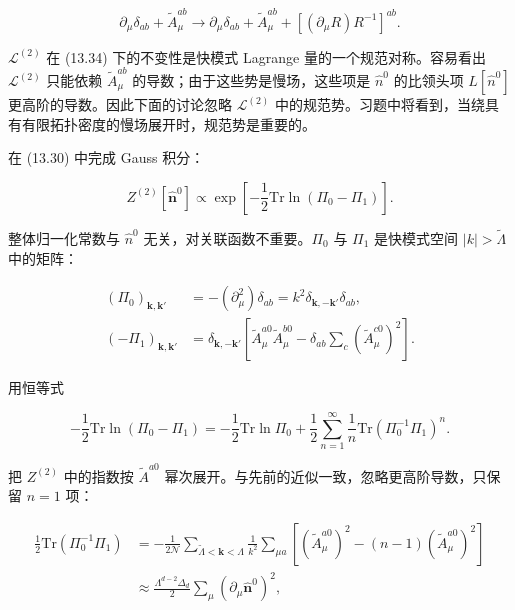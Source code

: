 \begin{equation*}
\partial_ {\mu} \delta_ {ab} + \tilde {A} _ {\mu} ^ {ab} \rightarrow \partial_ {\mu} \delta_ {ab} + \tilde {A} _ {\mu} ^ {ab} + \left[ ( \partial_ {\mu} R ) R ^ {- 1} \right] ^ {ab}.
\tag{13.34}
\end{equation*}

$\mathcal{L}^{(2)}$ 在 (13.34) 下的不变性是快模式 Lagrange 量的一个规范对称。容易看出 $\mathcal{L}^{(2)}$ 只能依赖 $\tilde{A}_{\mu}^{ab}$ 的导数；由于这些势是慢场，这些项是 $\hat{n}^{0}$ 的比领头项 $L[\hat{n}^{0}]$ 更高阶的导数。因此下面的讨论忽略 $\mathcal{L}^{(2)}$ 中的规范势。习题中将看到，当绕具有有限拓扑密度的慢场展开时，规范势是重要的。

在 (13.30) 中完成 Gauss 积分：

\begin{equation*}
Z ^ {(2)} [ \hat {\mathbf {n}} ^ {0} ] \propto \exp \left[ - \frac {1}{2} \mathrm{Tr} \ln \left( \Pi_ {0} - \Pi_ {1} \right) \right].
\tag{13.35}
\end{equation*}

整体归一化常数与 $\hat{n}^{0}$ 无关，对关联函数不重要。$\Pi_{0}$ 与 $\Pi_{1}$ 是快模式空间 $|k| > \tilde{\Lambda}$ 中的矩阵：

\begin{align*}
\left( \Pi_ {0} \right)_{\mathbf {k}, \mathbf {k} '} & = - \left( \partial_ {\mu} ^ {2} \right) \delta_ {ab} = k ^ {2} \delta_{\mathbf {k}, - \mathbf {k} '} \delta_ {ab} ,\\
\left( - \Pi_ {1} \right)_{\mathbf {k}, \mathbf {k} '} & = \delta_{\mathbf {k}, - \mathbf {k} '} \left[ \tilde {A} _ {\mu} ^ {a 0} \tilde {A} _ {\mu} ^ {b 0} - \delta_ {ab} \sum_ {c} \left( \tilde {A} _ {\mu} ^ {c 0} \right) ^ {2} \right] .
\tag{13.36}
\end{align*}

用恒等式

\begin{equation*}
- \frac {1}{2} \mathrm{Tr} \ln \left( \Pi_ {0} - \Pi_ {1} \right) = - \frac {1}{2} \mathrm{Tr} \ln \Pi_ {0} + \frac {1}{2} \sum_ {n = 1} ^ {\infty} \frac {1}{n} \mathrm{Tr} \left( \Pi_ {0} ^ {- 1} \Pi_ {1} \right) ^ {n}.
\tag{13.37}
\end{equation*}

把 $Z^{(2)}$ 中的指数按 $\tilde{A}^{a0}$ 幂次展开。与先前的近似一致，忽略更高阶导数，只保留 $n = 1$ 项：

\begin{align*}
\frac {1}{2} \mathrm{Tr} \left( \Pi_ {0} ^ {- 1} \Pi_ {1} \right) & = - \frac {1}{2 \mathcal {N}} \sum_{\tilde {\Lambda} < \mathbf {k} < \Lambda} \frac {1}{k ^ {2}} \sum_ {\mu a} \left[ \left( \tilde {A} _ {\mu} ^ {a 0} \right) ^ {2} - ( n - 1 ) \left( \tilde {A} _ {\mu} ^ {a 0} \right) ^ {2} \right]\\
& \approx \frac {\Lambda^ {d - 2} \Delta_ {d}}{2} \sum_ {\mu} \left( \partial_ {\mu} \hat {\mathbf {n}} ^ {0} \right) ^ {2} ,
\tag{13.38}
\end{align*}


